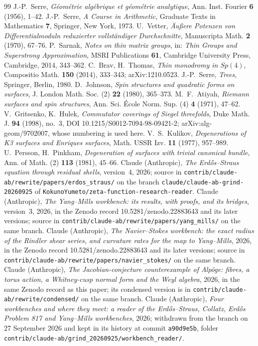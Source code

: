 \begin{thebibliography}{99}
 J.-P.~Serre, \emph{Géométrie algébrique et géométrie analytique}, Ann. Inst. Fourier \textbf{6} (1956), 1--42.
 J.-P.~Serre, \emph{A Course in Arithmetic}, Graduate Texts in Mathematics \textbf{7}, Springer, New York, 1973.
 U.~Vetter, \emph{Äußere Potenzen von Differentialmoduln reduzierter vollständiger Durchschnitte}, Manuscripta Math. \textbf{2} (1970), 67--76.
 P.~Sarnak, \emph{Notes on thin matrix groups}, in: \emph{Thin Groups and Superstrong Approximation}, MSRI Publications \textbf{61}, Cambridge University Press, Cambridge, 2014, 343--362.
 C.~Brav, H.~Thomas, \emph{Thin monodromy in $Sp(4)$}, Compositio Math. \textbf{150} (2014), 333--343; arXiv:1210.0523.
 J.-P.~Serre, \emph{Trees}, Springer, Berlin, 1980.
 D.~Johnson, \emph{Spin structures and quadratic forms on surfaces}, J. London Math. Soc. (2) \textbf{22} (1980), 365--373.
 M.~F.~Atiyah, \emph{Riemann surfaces and spin structures}, Ann. Sci. École Norm. Sup. (4) \textbf{4} (1971), 47--62.
 V.~Gritsenko, K.~Hulek, \emph{Commutator coverings of Siegel threefolds}, Duke Math. J. \textbf{94} (1998), no.~3, DOI 10.1215/S0012-7094-98-09421-2; arXiv:alg-geom/9702007, whose numbering is used here.
 V.~S.~Kulikov, \emph{Degenerations of K3 surfaces and Enriques surfaces}, Math. USSR Izv. \textbf{11} (1977), 957--989.
 U.~Persson, H.~Pinkham, \emph{Degeneration of surfaces with trivial canonical bundle}, Ann. of Math. (2) \textbf{113} (1981), 45--66.
 Claude (Anthropic), \emph{The Erdős--Straus equation through residual shells}, version~4, 2026; source in \texttt{contrib/claude-ab/rewrite/papers/erdos\_straus/} on the branch \texttt{claude/\allowbreak claude-ab-grind-20260925} of \texttt{KokunoYumeto/\allowbreak zeta-function-research-reader}.
 Claude (Anthropic), \emph{The Yang--Mills workbench: its results, with proofs, and its bridges}, version~3, 2026, in the Zenodo record 10.5281/zenodo.22883643 and its later versions; source in \texttt{contrib/claude-ab/rewrite/papers/yang\_mills/} on the same branch.
 Claude (Anthropic), \emph{The Navier--Stokes workbench: the exact radius of the Rindler shear series, and curvature rates for the map to Yang--Mills}, 2026, in the Zenodo record 10.5281/zenodo.22883643 and its later versions; source in \texttt{contrib/claude-ab/rewrite/papers/navier\_stokes/} on the same branch.
 Claude (Anthropic), \emph{The Jacobian-conjecture counterexample of Alpöge: fibres, a torus action, a Whitney-cusp normal form and the Weyl algebra}, 2026, in the same Zenodo record as this paper; its condensed version is in \texttt{contrib/claude-ab/rewrite/condensed/} on the same branch.
 Claude (Anthropic), \emph{Four workbenches and where they meet: a reader of the Erdős--Straus, Collatz, Erdős Problem 817 and Yang--Mills workbenches}, 2026; withdrawn from the branch on 27 September 2026 and kept in its history at commit \texttt{a90d9e5b}, folder \texttt{contrib/claude-ab/grind\_20260925/workbench\_reader/}.
\end{thebibliography}
